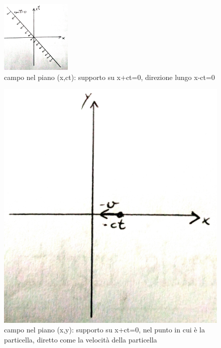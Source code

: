 \begin{figure}[htbp]
 \centering
 \includegraphics[width=0.3\textwidth]{images/foglio1_xt}
	\caption*{campo nel piano (x,ct): supporto su x+ct=0, direzione lungo x-ct=0}
 \label{figure:campoxt}
\end{figure}
\begin{figure}[htbp]
 \centering
 \includegraphics[width=.3\textwidth]{images/foglio1_xy}
	\caption*{campo nel piano (x,y): supporto su x+ct=0, nel punto in cui \`e la particella, diretto come la velocit\`a della particella}
 \label{figure:campoxy}
\end{figure}


 




































